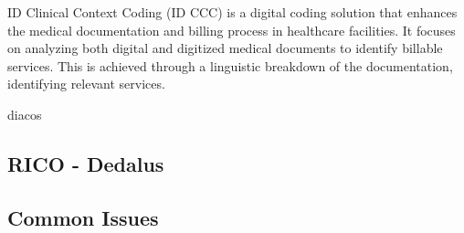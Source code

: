 ID Clinical Context Coding (ID CCC) is a digital coding solution that enhances the medical documentation and billing process in healthcare facilities.
It focuses on analyzing both digital and digitized medical documents to identify billable services.
This is achieved through a linguistic breakdown of the documentation, identifying relevant services.

diacos \cite{10.1007/978-3-642-82852-2_111}

\subsection{RICO - Dedalus}


\subsection{Common Issues}
